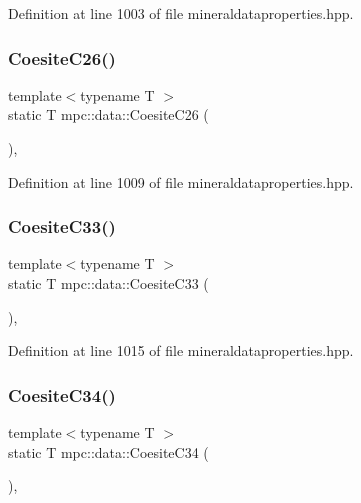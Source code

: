 Definition at line 1003 of file mineraldataproperties.\+hpp.

\mbox{\label{namespacempc_1_1data_ac3c7a78365ce9a367d253b12e58a4b93}} 
\subsubsection{\texorpdfstring{Coesite\+C26()}{CoesiteC26()}}
{\footnotesize\ttfamily template$<$typename T $>$ \\
static T mpc\+::data\+::\+Coesite\+C26 (\begin{DoxyParamCaption}{ }\end{DoxyParamCaption})\hspace{0.3cm}{\ttfamily [inline]}, {\ttfamily [static]}}



Definition at line 1009 of file mineraldataproperties.\+hpp.

\mbox{\label{namespacempc_1_1data_a869ca594d2cfed19ceaccbb21df9034b}} 
\subsubsection{\texorpdfstring{Coesite\+C33()}{CoesiteC33()}}
{\footnotesize\ttfamily template$<$typename T $>$ \\
static T mpc\+::data\+::\+Coesite\+C33 (\begin{DoxyParamCaption}{ }\end{DoxyParamCaption})\hspace{0.3cm}{\ttfamily [inline]}, {\ttfamily [static]}}



Definition at line 1015 of file mineraldataproperties.\+hpp.

\mbox{\label{namespacempc_1_1data_a2c02d8a88cbab6cd64fe839d7c802ef6}} 
\subsubsection{\texorpdfstring{Coesite\+C34()}{CoesiteC34()}}
{\footnotesize\ttfamily template$<$typename T $>$ \\
static T mpc\+::data\+::\+Coesite\+C34 (\begin{DoxyParamCaption}{ }\end{DoxyParamCaption})\hspace{0.3cm}{\ttfamily [inline]}, {\ttfamily [static]}}




